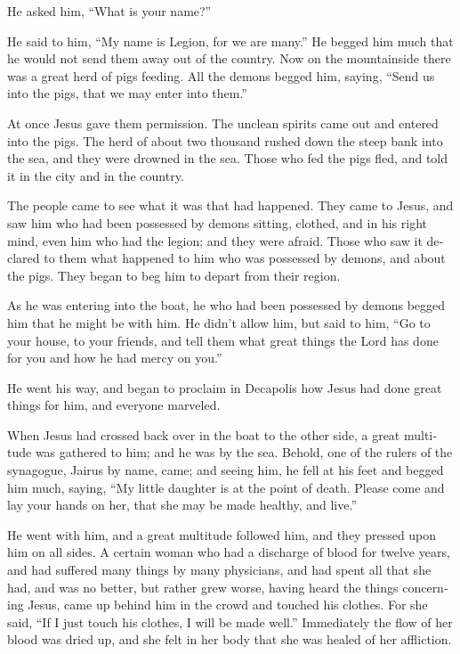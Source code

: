 \begin{paracol}{2}
\begin{otherlanguage}{english}
 He asked him, ``What is your name?''

He said to him, ``My name is Legion, for we are many.'' 
He begged him much that he would not send them away out of the country.
 Now on the mountainside there was a great herd of pigs
feeding.  All the demons begged him, saying, ``Send us
into the pigs, that we may enter into them.''

 At once Jesus gave them permission. The unclean spirits
came out and entered into the pigs. The herd of about two thousand
rushed down the steep bank into the sea, and they were drowned in the
sea.  Those who fed the pigs fled, and told it in the
city and in the country.

The people came to see what it was that had happened. 
They came to Jesus, and saw him who had been possessed by demons
sitting, clothed, and in his right mind, even him who had the legion;
and they were afraid.  Those who saw it declared to them
what happened to him who was possessed by demons, and about the pigs.
 They began to beg him to depart from their region.

 As he was entering into the boat, he who had been
possessed by demons begged him that he might be with him.
 He didn't allow him, but said to him, ``Go to your
house, to your friends, and tell them what great things the Lord has
done for you and how he had mercy on you.''

 He went his way, and began to proclaim in Decapolis how
Jesus had done great things for him, and everyone marveled.

 When Jesus had crossed back over in the boat to the
other side, a great multitude was gathered to him; and he was by the
sea.  Behold, one of the rulers of the synagogue, Jairus
by name, came; and seeing him, he fell at his feet  and
begged him much, saying, ``My little daughter is at the point of death.
Please come and lay your hands on her, that she may be made healthy, and
live.''

 He went with him, and a great multitude followed him,
and they pressed upon him on all sides.  A certain woman
who had a discharge of blood for twelve years,  and had
suffered many things by many physicians, and had spent all that she had,
and was no better, but rather grew worse,  having heard
the things concerning Jesus, came up behind him in the crowd and touched
his clothes.  For she said, ``If I just touch his
clothes, I will be made well.''  Immediately the flow of
her blood was dried up, and she felt in her body that she was healed of
her affliction.


\end{otherlanguage}
\end{paracol}
